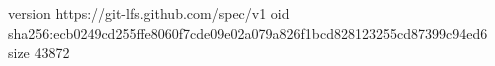 version https://git-lfs.github.com/spec/v1
oid sha256:ecb0249cd255ffe8060f7cde09e02a079a826f1bcd828123255cd87399c94ed6
size 43872
